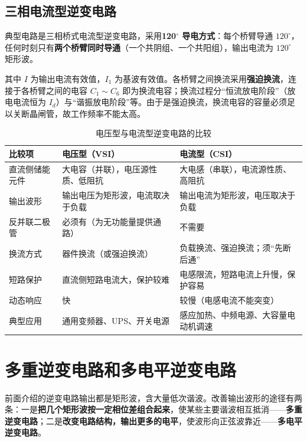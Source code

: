 \subsection{三相电流型逆变电路}

典型电路是三相桥式电流型逆变电路，采用\textbf{120$^\circ$ 导电方式}：每个桥臂导通 $120^\circ$，任何时刻只有\textbf{两个桥臂同时导通}（一个共阴组、一个共阳组），输出电流为 $120^\circ$ 矩形波。


其中 $I$ 为输出电流有效值，$I_1$ 为基波有效值。各桥臂之间换流采用\textbf{强迫换流}，连接于各桥臂之间的电容 $C_1\sim C_6$ 即为换流电容；换流过程分“恒流放电阶段”（放电电流恒为 $I_d$）与“谐振放电阶段”等。由于是强迫换流，换流电容的容量必须足以关断晶闸管，故工作频率不能太高。

\begin{table}[htbp]
\centering
\caption{电压型与电流型逆变电路的比较}
\label{tab:4-2}
\begin{tabular}{p{2.6cm}p{6.0cm}p{6.0cm}}
\toprule
\textbf{比较项} & \textbf{电压型（VSI）} & \textbf{电流型（CSI）} \\
\midrule
直流侧储能元件 & 大电容（并联），电压源性质、低阻抗 & 大电感（串联），电流源性质、高阻抗 \\
输出波形 & 输出电压为矩形波，电流取决于负载 & 输出电流为矩形波，电压取决于负载 \\
反并联二极管 & 必须有（为无功能量提供通路） & 不需要 \\
换流方式 & 器件换流（或强迫换流） & 负载换流、强迫换流；须“先断后通” \\
短路保护 & 直流侧短路电流大，保护较难 & 电感限流，短路电流上升慢，保护容易 \\
动态响应 & 快 & 较慢（电感电流不能突变） \\
典型应用 & 通用变频器、UPS、开关电源 & 感应加热、中频电源、大容量电动机调速 \\
\bottomrule
\end{tabular}
\end{table}

\section{多重逆变电路和多电平逆变电路}

前面介绍的逆变电路输出都是矩形波，含大量低次谐波。改善输出波形的途径有两条：一是\textbf{把几个矩形波按一定相位差组合起来}，使某些主要谐波相互抵消——\textbf{多重逆变电路}；二是\textbf{改变电路结构，输出更多的电平}，使波形向正弦波靠近——\textbf{多电平逆变电路}。

